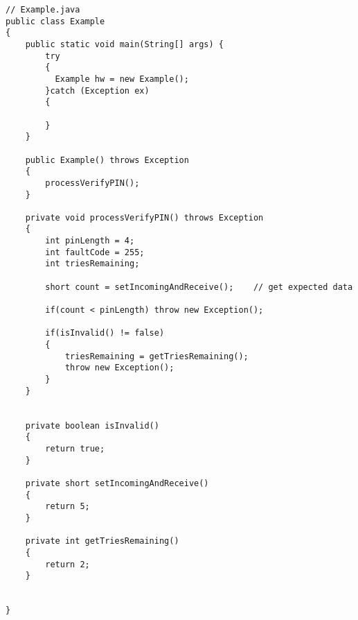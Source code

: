 \begin{lstlisting}
// Example.java
public class Example 
{
    public static void main(String[] args) {
        try
        {
		  Example hw = new Example();
        }catch (Exception ex)
        {

        }
    }

    public Example() throws Exception
    {
        processVerifyPIN();
    }

    private void processVerifyPIN() throws Exception
    {
        int pinLength = 4;
        int faultCode = 255;
        int triesRemaining;

        short count = setIncomingAndReceive();    // get expected data

        if(count < pinLength) throw new Exception();

        if(isInvalid() != false)
        {
            triesRemaining = getTriesRemaining();
            throw new Exception();
        }
    }


    private boolean isInvalid()
    {
        return true;
    }

    private short setIncomingAndReceive()
    {
        return 5;
    }

    private int getTriesRemaining()
    {
        return 2;
    }


}
\end{lstlisting}
\newpage
